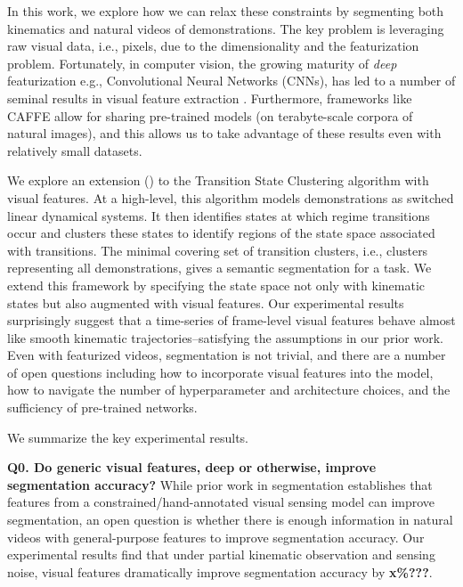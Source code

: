 In this work, we explore how we can relax these constraints by segmenting both kinematics and natural videos of demonstrations.
The key problem is leveraging raw visual data, i.e., pixels, due to the dimensionality and the featurization problem.
Fortunately, in computer vision, the growing maturity of \emph{deep} featurization e.g., Convolutional Neural Networks (CNNs), has led to a number of seminal results in visual feature extraction \cite{krizhevsky2012imagenet, lecun1995convolutional, jia2014caffe, long2014fully}.
Furthermore, frameworks like CAFFE \cite{jia2014caffe} allow for sharing pre-trained models (on terabyte-scale corpora of natural images), and this allows us to take advantage of these results even with relatively small datasets.

We explore an extension (\sys) to the Transition State Clustering algorithm \cite{krishnan2015tsc} with visual features.
At a high-level, this algorithm models demonstrations as switched linear dynamical systems.
It then identifies states at which regime transitions occur and clusters these states to identify regions of the state space associated with transitions.
The minimal covering set of transition clusters, i.e., clusters representing all demonstrations, gives a semantic segmentation for a task. 
We extend this framework by specifying the state space not only with kinematic states but also augmented with visual features.
Our experimental results surprisingly suggest that a time-series of frame-level visual features behave almost like smooth kinematic trajectories--satisfying the assumptions in our prior work.
Even with featurized videos, segmentation is not trivial, and there are a number of open questions including how to incorporate visual features into the model, how to navigate the number of hyperparameter and architecture choices, and the sufficiency of pre-trained networks.

We summarize the key experimental results.

\vspace{0.25em}

\textbf{Q0. Do generic visual features, deep or otherwise, improve segmentation accuracy? } While prior work in segmentation establishes that features from a constrained/hand-annotated visual sensing model can improve segmentation, an open question is whether there is enough information in natural videos with general-purpose features to improve segmentation accuracy. Our experimental results find that under partial kinematic observation and sensing noise, visual features dramatically improve segmentation accuracy by \textbf{x\%???}.


